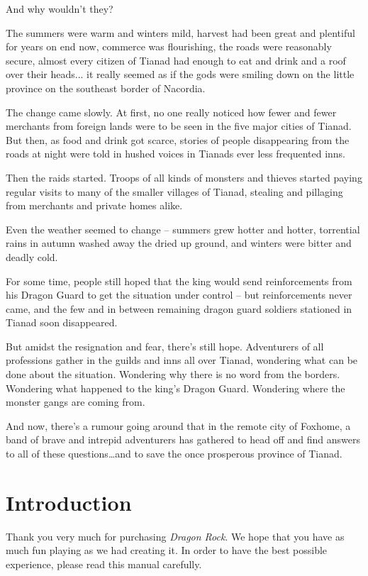 \documentclass[12pt]{scrbook}
\begin{document}
And why wouldn't they?

The summers were warm and winters mild, harvest had been great and plentiful for years on end now, commerce was flourishing, the roads were reasonably secure, almost every citizen of Tianad had enough to eat and drink and a roof over their heads... it really seemed as if the gods were smiling down on the little province on the southeast border of Nacordia.

The change came slowly. At first, no one really noticed how fewer and fewer merchants from foreign lands were to be seen in the five major cities of Tianad. But then, as food and drink got scarce, stories of people disappearing from the roads at night were told in hushed voices in Tianads ever less frequented inns.

Then the raids started. Troops of all kinds of monsters and thieves started paying regular visits to many of the smaller villages of Tianad, stealing and pillaging from merchants and private homes alike.

Even the weather seemed to change -- summers grew hotter and hotter, torrential rains in autumn washed away the dried up ground, and winters were bitter and deadly cold.

For some time, people still hoped that the king would send reinforcements from his Dragon Guard to get the situation under control -- but reinforcements never came, and the few and in between remaining dragon guard soldiers stationed in Tianad soon disappeared.

\medskip

But amidst the resignation and fear, there's still hope. Adventurers of all professions gather in the guilds and inns all over Tianad, wondering what can be done about the situation. Wondering why there is no word from the borders. Wondering what happened to the king's Dragon Guard. Wondering where the monster gangs are coming from.

And now, there's a rumour going around that in the remote city of Foxhome, a band of brave and intrepid adventurers has gathered to head off and find answers to all of these questions\dots and to save the once prosperous province of Tianad.

\chapter{Introduction}
Thank you very much for purchasing \textit{Dragon Rock}. We hope that you have as much fun playing as we had creating it. In order to have the best possible experience, please read this manual carefully.
\end{document}
